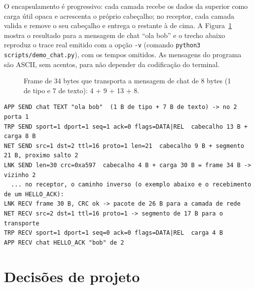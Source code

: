 \documentclass[11pt,a4paper]{article}
\begin{document}
O encapsulamento \'e progressivo: cada camada recebe os dados da superior como carga \'util opaca e acrescenta o pr\'oprio cabe\c{c}alho; no receptor, cada camada valida e remove o seu cabe\c{c}alho e entrega o restante \`a de cima. A Figura~\ref{fig:encap} mostra o resultado para a mensagem de chat ``ola bob'' e o trecho abaixo reproduz o trace real emitido com a op\c{c}\~ao \texttt{-v} (comando \texttt{python3 scripts/demo\_chat.py}), com os tempos omitidos. As mensagens do programa s\~ao ASCII, sem acentos, para n\~ao depender da codifica\c{c}\~ao do terminal.

\begin{figure}[H]
\centering
{}
\caption{Frame de 34 bytes que transporta a mensagem de chat de 8 bytes (1 de tipo e 7 de texto): 4 + 9 + 13 + 8.}
\label{fig:encap}
\end{figure}

\begin{lstlisting}
APP SEND chat TEXT "ola bob"  (1 B de tipo + 7 B de texto) -> no 2 porta 1
TRP SEND sport=1 dport=1 seq=1 ack=0 flags=DATA|REL  cabecalho 13 B + carga 8 B
NET SEND src=1 dst=2 ttl=16 proto=1 len=21  cabecalho 9 B + segmento 21 B, proximo salto 2
LNK SEND len=30 crc=0xa597  cabecalho 4 B + carga 30 B = frame 34 B -> vizinho 2
  ... no receptor, o caminho inverso (o exemplo abaixo e o recebimento de um HELLO_ACK):
LNK RECV frame 30 B, CRC ok -> pacote de 26 B para a camada de rede
NET RECV src=2 dst=1 ttl=16 proto=1 -> segmento de 17 B para o transporte
TRP RECV sport=1 dport=1 seq=0 ack=0 flags=DATA|REL  carga 4 B
APP RECV chat HELLO_ACK "bob" de 2
\end{lstlisting}

\section{Decis\~oes de projeto}
\end{document}
